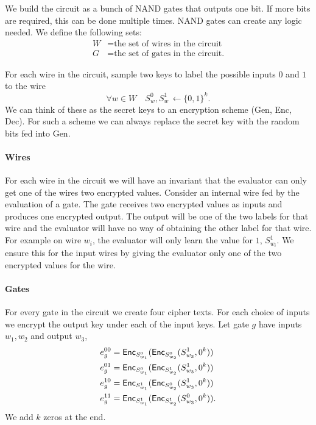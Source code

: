 
We build the circuit as a bunch of NAND gates that outputs one bit. 
If more bits are required, this can be done multiple times.
NAND gates can create any logic needed. 
We define the following sets:
\begin{align*}
W &= \text{the set of wires in the circuit}\\
G &= \text{the set of gates in the circuit.}
\end{align*}

For  each wire in the circuit, sample two keys
to label the possible inputs $0$ and $1$  to the wire
\[
\forall w \in W  \quad S_w^0, S_w^1 \,  \leftarrow{} \{0,1\}^k.
\]
We can think of these as the secret keys to an encryption scheme
(Gen, Enc, Dec).
For such a scheme we can always replace the secret key with the random bits fed into Gen.


\paragraph{Wires}
For each wire in the circuit we will have an invariant that the evaluator can only get one of the wires two encrypted values.
Consider an internal wire fed by the evaluation of a gate. The gate receives two encrypted values as inputs
and produces one encrypted output. The output will be one of the two labels for that wire and the evaluator will have no 
way of obtaining the other label for that wire. 
For example on wire $w_i$, the evaluator will only learn the value for $1$,  $S_{w_i}^1$.
We ensure this for the input wires by giving the evaluator only one of the two encrypted values for the wire.

\paragraph{Gates}
For every gate in the circuit we create four cipher texts. 
For each choice of inputs we encrypt the output key under each of the input keys. 
Let gate $g$ have inputs $w_1, w_2$ and output $w_3$,
\begin{align*}
e_g^{00} &= \mathsf{Enc}_{S_{w_1}^0} ( \mathsf{Enc}_{S_{w_2}^0}  ( S_{w_3}^1, 0^k) )\\
e_g^{01} &= \mathsf{Enc}_{S_{w_1}^0} ( \mathsf{Enc}_{S_{w_2}^1}  ( S_{w_3}^1, 0^k) )\\
e_g^{10} &= \mathsf{Enc}_{S_{w_1}^1} ( \mathsf{Enc}_{S_{w_2}^0}  ( S_{w_3}^1, 0^k) )\\
e_g^{11} &= \mathsf{Enc}_{S_{w_1}^1} ( \mathsf{Enc}_{S_{w_2}^1}  ( S_{w_3}^0, 0^k) ).
\end{align*}
We add $k$ zeros at the end.

